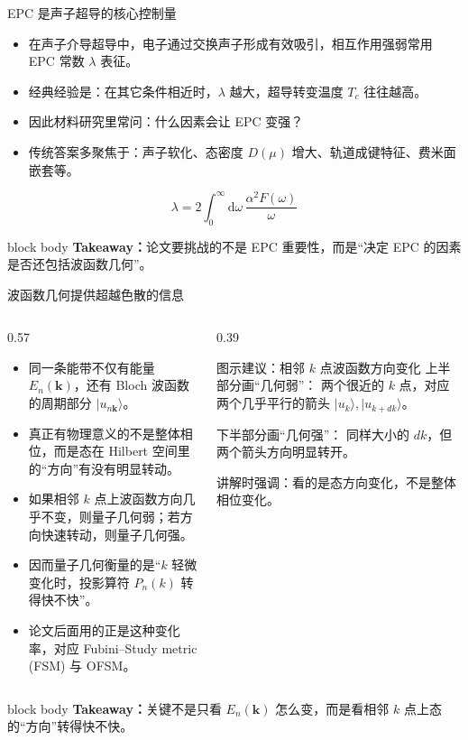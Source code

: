 \documentclass[aspectratio=169,11pt,UTF8]{ctexbeamer}
\newcommand{\takeaway}[1]{%
  \vfill
  \begin{beamercolorbox}[wd=\textwidth,sep=0.7ex,rounded=true]{block body}
    \small\textbf{Takeaway：}#1
  \end{beamercolorbox}
}
\begin{document}
\begin{frame}{EPC 是声子超导的核心控制量}
  \begin{itemize}
    \item 在声子介导超导中，电子通过交换声子形成有效吸引，相互作用强弱常用 EPC 常数 $\lambda$ 表征。
    \item 经典经验是：在其它条件相近时，$\lambda$ 越大，超导转变温度 $T_c$ 往往越高。
    \item 因此材料研究里常问：什么因素会让 EPC 变强？
    \item 传统答案多聚焦于：声子软化、态密度 $D(\mu)$ 增大、轨道成键特征、费米面嵌套等。
  \end{itemize}
  \begin{equation*}
    \lambda = 2 \int_0^\infty \mathrm{d}\omega \, \frac{\alpha^2 F(\omega)}{\omega}
  \end{equation*}
  \takeaway{论文要挑战的不是 EPC 重要性，而是“决定 EPC 的因素是否还包括波函数几何”。}
\end{frame}

\begin{frame}{波函数几何提供超越色散的信息}
  \begin{columns}[T]
    \begin{column}{0.57\textwidth}
      \begin{itemize}
        \item 同一条能带不仅有能量 $E_n(\mathbf{k})$，还有 Bloch 波函数的周期部分 $|u_{n\mathbf{k}}\rangle$。
        \item 真正有物理意义的不是整体相位，而是态在 Hilbert 空间里的“方向”有没有明显转动。
        \item 如果相邻 $k$ 点上波函数方向几乎不变，则量子几何弱；若方向快速转动，则量子几何强。
        \item 因而量子几何衡量的是“$k$ 轻微变化时，投影算符 $P_n(k)$ 转得快不快”。
        \item 论文后面用的正是这种变化率，对应 Fubini--Study metric (FSM) 与 OFSM。
      \end{itemize}
    \end{column}
    \begin{column}{0.39\textwidth}
      \begin{block}{图示建议：相邻 $k$ 点波函数方向变化}
        \small
        上半部分画“几何弱”：
        两个很近的 $k$ 点，对应两个几乎平行的箭头 $|u_k\rangle, |u_{k+dk}\rangle$。

        下半部分画“几何强”：
        同样大小的 $dk$，但两个箭头方向明显转开。

        讲解时强调：看的是态方向变化，不是整体相位变化。
      \end{block}
    \end{column}
  \end{columns}
  \takeaway{关键不是只看 $E_n(\mathbf{k})$ 怎么变，而是看相邻 $k$ 点上态的“方向”转得快不快。}
\end{frame}
\end{document}
